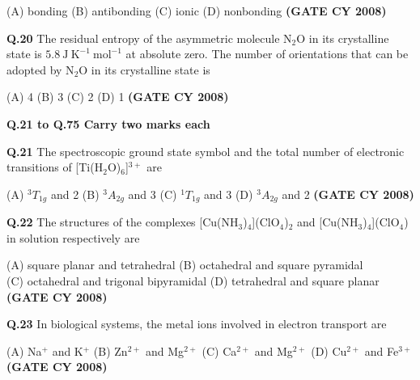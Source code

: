 \documentclass[12pt]{article}
\begin{document}
\begin{enumerate}
(A) bonding \hspace{1cm}
(B) antibonding \hspace{1cm}
(C) ionic \hspace{1cm}
(D) nonbonding   \textbf{(GATE CY 2008)}


\vspace{0.5cm}

\textbf{Q.20} The residual entropy of the asymmetric molecule N$_2$O in its crystalline state is $5.8\ \mathrm{J\ K^{-1}\ mol^{-1}}$ at absolute zero. The number of orientations that can be adopted by N$_2$O in its crystalline state is

(A) 4 \hspace{1cm}
(B) 3 \hspace{1cm}
(C) 2 \hspace{1cm}
(D) 1   \textbf{(GATE CY 2008)}


\vspace{0.5cm}

\textbf{Q.21 to Q.75 Carry two marks each}

\vspace{0.5cm}

\textbf{Q.21} The spectroscopic ground state symbol and the total number of electronic transitions of [Ti(H$_2$O)$_6$]$^{3+}$ are

(A) $^3T_{1g}$ and 2 \hspace{1cm}
(B) $^3A_{2g}$ and 3 \hspace{1cm}
(C) $^1T_{1g}$ and 3 \hspace{1cm}
(D) $^3A_{2g}$ and 2   \textbf{(GATE CY 2008)}


\vspace{0.5cm}

\textbf{Q.22} The structures of the complexes [Cu(NH$_3$)$_4$](ClO$_4$)$_2$ and [Cu(NH$_3$)$_4$](ClO$_4$) in solution respectively are

(A) square planar and tetrahedral \hspace{1cm}
(B) octahedral and square pyramidal\\
(C) octahedral and trigonal bipyramidal \hspace{1cm}
(D) tetrahedral and square planar   \textbf{(GATE CY 2008)}


\vspace{0.5cm}

\textbf{Q.23} In biological systems, the metal ions involved in electron transport are

(A) Na$^+$ and K$^+$ \hspace{1cm}
(B) Zn$^{2+}$ and Mg$^{2+}$ \hspace{1cm}
(C) Ca$^{2+}$ and Mg$^{2+}$ \hspace{1cm}
(D) Cu$^{2+}$ and Fe$^{3+}$   \textbf{(GATE CY 2008)}



\end{enumerate}
\end{document}
